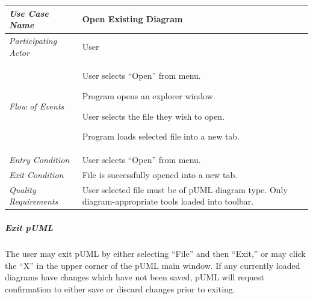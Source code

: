 \documentclass[twoside,letterpaper]{article}
\newenvironment{my_enumerate}{
\begin{enumerate}
  \setlength{\itemsep}{1pt}
  \setlength{\parskip}{0pt}
  \setlength{\parsep}{0pt}}{\end{enumerate}
}
\begin{document}
\begin{flushleft}
\tablehead{}
\begin{tabular}{|m{2.0in} m{5.0in}|}
\hline
{\bfseries\emph{Use Case Name}}
& {\bfseries Open Existing Diagram}
\\\hline
\emph{Participating Actor}
& User
\\\hline
\emph{Flow of Events}
& \begin{my_enumerate}
\item User selects ``Open'' from menu.
\item Program opens an explorer window.
\item User selects the file they wish to open.
\item Program loads selected file into a new tab.
\end{my_enumerate}
\\\hline
\emph{Entry Condition}
& User selects ``Open'' from menu.
\\\hline
\emph{Exit Condition}
& File is successfully opened into a new tab.
\\\hline
\emph{Quality Requirements}
& User selected file must be of pUML diagram type.\newline
  Only diagram-appropriate tools loaded into toolbar.
\\\hline
\end{tabular}
\end{flushleft}

\bigskip



\subparagraph[\ Exit pUML] 
{\bfseries Exit pUML }
{ The user may exit pUML by either selecting ``File'' and then ``Exit,'' or may click the ``X'' in the upper corner of the pUML main window. If any currently loaded diagrams have changes which have not been saved, pUML will request confirmation to either save or discard changes prior to exiting. }
\end{document}
